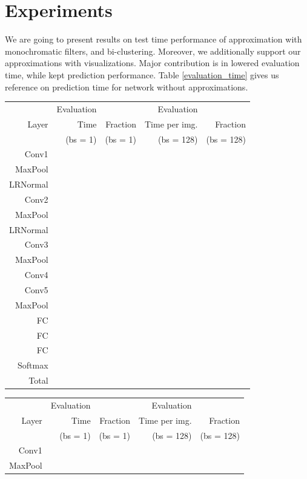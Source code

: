 \section{Experiments}

We are going to present results on test time performance of approximation with monochromatic filters, and bi-clustering. Moreover,
we additionally support our approximations with visualizations. Major contribution is in lowered evaluation time, while kept prediction performance.
Table \ref{evaluation_time} gives us reference on prediction time for network without approximations.

\begin{table}[t]
\tiny
\parbox{.99\linewidth}{
\centering
\begin{tabular}{rrrrr}
\hline
& Evaluation & & Evaluation &  \\
Layer & Time & Fraction & Time per img. & Fraction \\
& (bs = 1) & (bs = 1) & (bs = 128) & (bs = 128) \\
\hline
Conv1 & & & & \\
MaxPool & & & & \\
LRNormal & & & & \\
Conv2 & & & & \\
MaxPool & & & & \\
LRNormal & & & & \\
Conv3 & & & & \\
MaxPool & & & & \\
Conv4 & & & & \\
Conv5 & & & & \\
MaxPool & & & & \\
FC & & & & \\
FC & & & & \\
FC & & & & \\
Softmax & & & & \\
\hline 
Total & & & & \\
\hline
\end{tabular}
\vspace{5mm}
}
\parbox{.99\linewidth}{
\centering
\begin{tabular}{rrrrr}
\hline
& Evaluation & & Evaluation &  \\
Layer & Time & Fraction & Time per img. & Fraction \\
& (bs = 1) & (bs = 1) & (bs = 128) & (bs = 128) \\
\hline
Conv1 & & & & \\
MaxPool & & & & \\

\end{tabular}}
\end{table}
